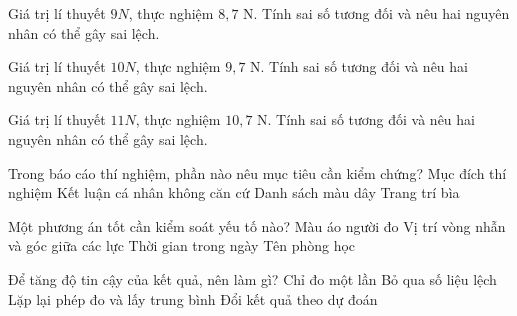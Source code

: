 \begin{bt}
Giá trị lí thuyết $9N$, thực nghiệm $8,7$ N. Tính sai số tương đối và nêu hai nguyên nhân có thể gây sai lệch.
\end{bt}

\begin{bt}
Giá trị lí thuyết $10N$, thực nghiệm $9,7$ N. Tính sai số tương đối và nêu hai nguyên nhân có thể gây sai lệch.
\end{bt}

\begin{bt}
Giá trị lí thuyết $11N$, thực nghiệm $10,7$ N. Tính sai số tương đối và nêu hai nguyên nhân có thể gây sai lệch.
\end{bt}

\begin{ex}
Trong báo cáo thí nghiệm, phần nào nêu mục tiêu cần kiểm chứng?
\choice
{\True Mục đích thí nghiệm}
{Kết luận cá nhân không căn cứ}
{Danh sách màu dây}
{Trang trí bìa}
\end{ex}

\begin{ex}
Một phương án tốt cần kiểm soát yếu tố nào?
\choice
{Màu áo người đo}
{\True Vị trí vòng nhẫn và góc giữa các lực}
{Thời gian trong ngày}
{Tên phòng học}
\end{ex}

\begin{ex}
Để tăng độ tin cậy của kết quả, nên làm gì?
\choice
{Chỉ đo một lần}
{Bỏ qua số liệu lệch}
{\True Lặp lại phép đo và lấy trung bình}
{Đổi kết quả theo dự đoán}
\end{ex}

